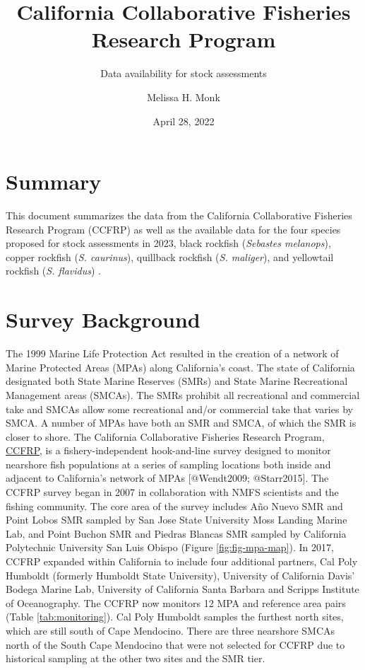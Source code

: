 \documentclass[
]{article}
\title{California Collaborative Fisheries Research Program}
\subtitle{Data availability for stock assessments}
\author{Melissa H. Monk}
\date{April 28, 2022}
\begin{document}
\maketitle

\hypertarget{summary}{%
\section{Summary}\label{summary}}

This document summarizes the data from the California Collaborative
Fisheries Research Program (CCFRP) as well as the available data for the four
species proposed for stock assessments in 2023, black rockfish (\emph{Sebastes melanops}),
copper rockfish (\emph{S. caurinus}), quillback rockfish (\emph{S. maliger}), and
yellowtail rockfish (\emph{S. flavidus}) .

\hypertarget{survey-background}{%
\section{Survey Background}\label{survey-background}}

The 1999 Marine Life Protection Act resulted in the creation of a network of
Marine Protected Areas (MPAs) along California's coast. The state of California
designated both State Marine Reserves (SMRs) and State Marine Recreational
Management areas (SMCAs). The SMRs prohibit all recreational and commercial take
and SMCAs allow some recreational and/or commercial take that varies by SMCA.
A number of MPAs have both an SMR and SMCA, of which the SMR is closer to shore.
The California Collaborative Fisheries Research Program,
\href{https://www.mlml.calstate.edu/ccfrp/}{CCFRP},
is a fishery-independent hook-and-line survey designed to monitor nearshore fish
populations at a series of sampling locations both inside and adjacent to
California's network of MPAs {[}@Wendt2009; @Starr2015{]}. The CCFRP survey began in
2007 in collaboration with NMFS scientists and the fishing community. The core
area of the survey includes Año Nuevo SMR and Point Lobos SMR sampled by
San Jose State University Moss Landing Marine Lab, and Point Buchon SMR
and Piedras Blancas SMR sampled by California Polytechnic University
San Luis Obispo (Figure \ref{fig:fig-mpa-map}). In 2017, CCFRP expanded within California to
include four additional partners, Cal Poly Humboldt (formerly Humboldt State
University), University of California Davis' Bodega Marine Lab, University
of California Santa Barbara and Scripps Institute of Oceanography.
The CCFRP now monitors 12 MPA and reference area pairs (Table \ref{tab:monitoring}).
Cal Poly Humboldt samples the furthest north sites, which are still south of Cape
Mendocino. There are three nearshore SMCAs north of the South Cape Mendocino that
were not selected for CCFRP due to historical sampling at the other two sites and
the SMR tier.
\end{document}
